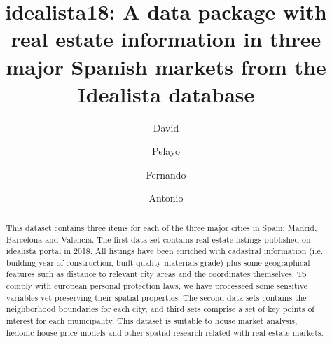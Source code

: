 \documentclass[times,final]{elsarticle}
\begin{document}

\begin{frontmatter}

\title{idealista18: A data package with real estate information in three major Spanish markets from the Idealista database }%

\author[1]{David }
\author[1]{Pelayo }
\author[2]{Fernando }
\author[3]{Antonio }

\address[1]{idealista, Plaza de las Cortes 5, 28014 Madrid, Spain}
\address[2]{Facultad de CC de la Empresa, C/ Real, 3. 30201 Cartagena, Murcia (Spain)}
\address[3]{School of Earth, Environment and Society, McMaster University, 1280 Main St W, Hamilton, Ontario L8S 4K1 Canada}



\begin{abstract}
This dataset contains three items for each of the three major cities in Spain: Madrid, Barcelona and Valencia. The first data set contains real estate listings published on idealista portal in 2018. All listings have been enriched with cadastral information (i.e. building year of construction, built quality materials grade) plus some geographical features such as distance to relevant city areas and the coordinates themselves. To comply with european personal protection laws, we have processeed some sensitive variables yet preserving their spatial properties. The second data sets contains the neighborhood boundaries for each city, and third sets comprise a set of key points of interest for each municipality.
This dataset is suitable to house market analysis, hedonic house price models and other spatial research related with real estate markets.


\end{abstract}
\end{frontmatter}
\end{document}
